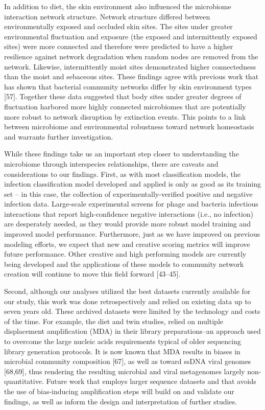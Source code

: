 \documentclass[12pt,]{article}
\begin{document}
In addition to diet, the skin environment also influenced the microbiome
interaction network structure. Network structure differed between
environmentally exposed and occluded skin sites. The sites under greater
environmental fluctuation and exposure (the exposed and intermittently
exposed sites) were more connected and therefore were predicted to have
a higher resilience against network degradation when random nodes are
removed from the network. Likewise, intermittently moist sites
demonstrated higher connectedness than the moist and sebaceous sites.
These findings agree with previous work that has shown that bacterial
community networks differ by skin environment types {[}57{]}. Together
these data suggested that body sites under greater degrees of
fluctuation harbored more highly connected microbiomes that are
potentially more robust to network disruption by extinction events. This
points to a link between microbiome and environmental robustness toward
network homeostasis and warrants further investigation.

While these findings take us an important step closer to understanding
the microbiome through interspecies relationships, there are caveats and
considerations to our findings. First, as with most classification
models, the infection classification model developed and applied is only
as good as its training set -- in this case, the collection of
experimentally-verified positive and negative infection data.
Large-scale experimental screens for phage and bacteria infectious
interactions that report high-confidence negative interactions (i.e., no
infection) are desperately needed, as they would provide more robust
model training and improved model performance. Furthermore, just as we
have improved on previous modeling efforts, we expect that new and
creative scoring metrics will improve future performance. Other creative
and high performing models are currently being developed and the
applications of these models to community network creation will continue
to move this field forward {[}43--45{]}.

Second, although our analyses utilized the best datasets currently
available for our study, this work was done retrospectively and relied
on existing data up to seven years old. These archived datasets were
limited by the technology and costs of the time. For example, the diet
and twin studies, relied on multiple displacement amplification (MDA) in
their library preparations--an approach used to overcome the large
nucleic acids requirements typical of older sequencing library
generation protocols. It is now known that MDA results in biases in
microbial community composition {[}67{]}, as well as toward ssDNA viral
genomes {[}68,69{]}, thus rendering the resulting microbial and viral
metagenomes largely non-quantitative. Future work that employs larger
sequence datasets and that avoids the use of bias-inducing amplification
steps will build on and validate our findings, as well as inform the
design and interpretation of further studies.
\end{document}

